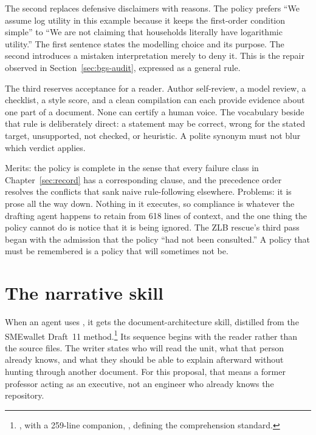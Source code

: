 The second replaces defensive disclaimers with reasons. The policy prefers
``We assume log utility in this example because it keeps the first-order
condition simple'' to ``We are not claiming that households literally have
logarithmic utility.'' The first sentence states the modelling choice and its
purpose. The second introduces a mistaken interpretation merely to deny it.
This is the repair observed in Section~\ref{sec:bgs-audit}, expressed as a
general rule.

The third reserves acceptance for a reader. Author self-review, a model review,
a checklist, a style score, and a clean compilation can each provide evidence
about one part of a document. None can certify a human voice. The vocabulary
beside that rule is deliberately direct: a statement may be correct, wrong for
the stated target, unsupported, not checked, or heuristic. A polite synonym
must not blur which verdict applies.

Merits: the policy is complete in the sense that every failure class in
Chapter~\ref{sec:record} has a corresponding clause, and the precedence order
resolves the conflicts that sank naive rule-following elsewhere. Problems:
it is prose all the way down. Nothing in it executes, so compliance is
whatever the drafting agent happens to retain from 618 lines of context, and
the one thing the policy cannot do is notice that it is being ignored. The
ZLB rescue's third pass began with the admission that the policy ``had not
been consulted.'' A policy that must be remembered is a policy that will
sometimes not be.

\section{The narrative skill}
\label{sec:tool-linear}

When an agent uses , it gets the
document-architecture skill,
distilled from the SMEwallet Draft~11 method.\footnote{, with a 259-line companion, , defining the comprehension standard.}
Its sequence begins with the reader rather than the source files. The writer
states who will read the unit, what that person already knows, and what they
should be able to explain afterward without hunting through another document.
For this proposal, that means a former professor acting as an executive, not an
engineer who already knows the repository.


